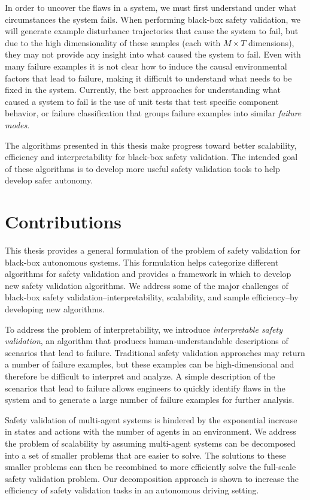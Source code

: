 In order to uncover the flaws in a system, we must first understand under what circumstances the system fails. When performing black-box safety validation, we will generate example disturbance trajectories that cause the system to fail, but due to the high dimensionality of these samples (each with $M \times T$ dimensions), they may not provide any insight into what caused the system to fail. Even with many failure examples it is not clear how to induce the causal environmental factors that lead to failure, making it difficult to understand what needs to be fixed in the system. Currently, the best approaches for understanding what caused a system to fail is the use of unit tests that test specific component behavior, or failure classification that groups failure examples into similar \emph{failure modes}. 

The algorithms presented in this thesis make progress toward better scalability, efficiency and interpretability for black-box safety validation. The intended goal of these algorithms is to develop more useful safety validation tools to help develop safer autonomy.


\section{Contributions}

This thesis provides a general formulation of the problem of safety validation for black-box autonomous systems. This formulation helps categorize different algorithms for safety validation and provides a framework in which to develop new safety validation algorithms. We address some of the major challenges of black-box safety validation--interpretability, scalability, and sample efficiency--by developing new algorithms.

To address the problem of interpretability, we introduce \emph{interpretable safety validation}, an algorithm that produces human-understandable descriptions of scenarios that lead to failure. Traditional safety validation approaches may return a number of failure examples, but these examples can be high-dimensional and therefore be difficult to interpret and analyze. A simple description of the scenarios that lead to failure allows engineers to quickly identify flaws in the system and to generate a large number of failure examples for further analysis. 

Safety validation of multi-agent systems is hindered by the exponential increase in states and actions with the number of agents in an environment. We address the problem of scalability by assuming multi-agent systems can be decomposed into a set of smaller problems that are easier to solve. The solutions to these smaller problems can then be recombined to more efficiently solve the full-scale safety validation problem. Our decomposition approach is shown to increase the efficiency of safety validation tasks in an autonomous driving setting.

